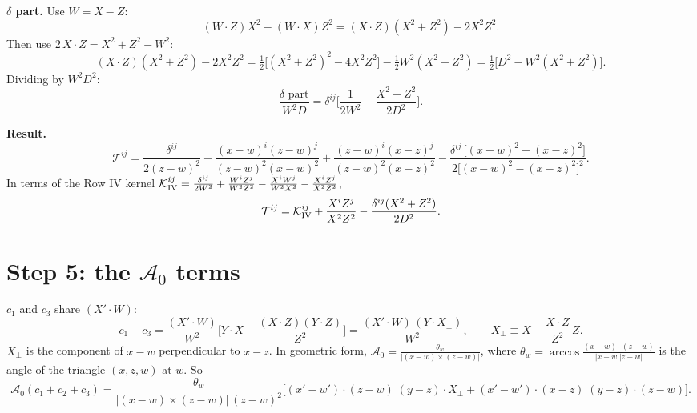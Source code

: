 \documentclass[10pt]{article}
\begin{document}
\noindent\textbf{$\delta$ part.} Use $W=X-Z$:
\begin{equation}
(W\cdot Z)X^{2}-(W\cdot X)Z^{2}=(X\cdot Z)(X^{2}+Z^{2})-2X^{2}Z^{2}.
\end{equation}
Then use $2\,X\cdot Z=X^{2}+Z^{2}-W^{2}$:
\begin{equation}
(X\cdot Z)(X^{2}+Z^{2})-2X^{2}Z^{2}=\tfrac12\big[(X^{2}+Z^{2})^{2}-4X^{2}Z^{2}\big]-\tfrac12W^{2}(X^{2}+Z^{2})=\tfrac12\big[D^{2}-W^{2}(X^{2}+Z^{2})\big].
\end{equation}
Dividing by $W^{2}D^{2}$:
\begin{equation}
\frac{\delta\text{ part}}{W^{2}D}=\delta^{ij}\Big[\frac{1}{2W^{2}}-\frac{X^{2}+Z^{2}}{2D^{2}}\Big].
\end{equation}

\noindent\textbf{Result.}
\begin{equation}
\mathcal T^{ij}=\frac{\delta^{ij}}{2(z-w)^{2}}-\frac{(x-w)^{i}(z-w)^{j}}{(z-w)^{2}(x-w)^{2}}+\frac{(z-w)^{i}(x-z)^{j}}{(z-w)^{2}(x-z)^{2}}-\frac{\delta^{ij}\,\big[(x-w)^{2}+(x-z)^{2}\big]}{2\big[(x-w)^{2}-(x-z)^{2}\big]^{2}}.
\end{equation}
In terms of the Row IV kernel $\mathcal K^{ij}_{\rm IV}=\frac{\delta^{ij}}{2W^{2}}+\frac{W^{i}Z^{j}}{W^{2}Z^{2}}-\frac{X^{i}W^{j}}{W^{2}X^{2}}-\frac{X^{i}Z^{j}}{X^{2}Z^{2}}$,
\begin{equation}
\mathcal T^{ij}=\mathcal K^{ij}_{\rm IV}+\frac{X^{i}Z^{j}}{X^{2}Z^{2}}-\frac{\delta^{ij}(X^{2}+Z^{2})}{2D^{2}}.
\end{equation}

\section*{Step 5: the $\mathcal A_{0}$ terms}
$c_{1}$ and $c_{3}$ share $(X'\cdot W)$:
\begin{equation}
c_{1}+c_{3}=\frac{(X'\cdot W)}{W^{2}}\Big[Y\cdot X-\frac{(X\cdot Z)(Y\cdot Z)}{Z^{2}}\Big]=\frac{(X'\cdot W)\,(Y\cdot X_{\perp})}{W^{2}},\qquad X_{\perp}\equiv X-\frac{X\cdot Z}{Z^{2}}\,Z .
\end{equation}
$X_{\perp}$ is the component of $x-w$ perpendicular to $x-z$. In geometric form, $\mathcal A_{0}=\frac{\theta_{w}}{|(x-w)\times(z-w)|}$, where $\theta_{w}=\arccos\frac{(x-w)\cdot(z-w)}{|x-w||z-w|}$ is the angle of the triangle $(x,z,w)$ at $w$. So
\begin{equation}
\mathcal A_{0}(c_{1}+c_{2}+c_{3})=\frac{\theta_{w}}{|(x-w)\times(z-w)|\,(z-w)^{2}}\Big[(x'-w')\cdot(z-w)\;(y-z)\cdot X_{\perp}+(x'-w')\cdot(x-z)\;(y-z)\cdot(z-w)\Big].
\end{equation}
\end{document}
